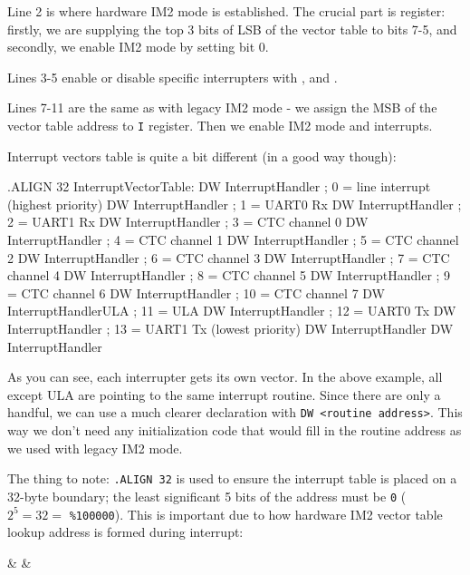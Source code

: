 Line 2 is where hardware IM2 mode is established. The crucial part is  register: firstly, we are supplying the top 3 bits of LSB of the vector table to bits 7-5, and secondly, we enable IM2 mode by setting bit 0.

Lines 3-5 enable or disable specific interrupters with ,  and .

Lines 7-11 are the same as with legacy IM2 mode - we assign the MSB of the vector table address to {\tt I} register. Then we enable IM2 mode and interrupts.

Interrupt vectors table is quite a bit different (in a good way though):

\begin{tcblisting}{}
	.ALIGN 32
InterruptVectorTable:
	DW InterruptHandler        ; 0 = line interrupt (highest priority)
	DW InterruptHandler        ; 1 = UART0 Rx
	DW InterruptHandler        ; 2 = UART1 Rx
	DW InterruptHandler        ; 3 = CTC channel 0
	DW InterruptHandler        ; 4 = CTC channel 1
	DW InterruptHandler        ; 5 = CTC channel 2
	DW InterruptHandler        ; 6 = CTC channel 3
	DW InterruptHandler        ; 7 = CTC channel 4
	DW InterruptHandler        ; 8 = CTC channel 5
	DW InterruptHandler        ; 9 = CTC channel 6
	DW InterruptHandler        ; 10 = CTC channel 7
	DW InterruptHandlerULA     ; 11 = ULA
	DW InterruptHandler        ; 12 = UART0 Tx
	DW InterruptHandler        ; 13 = UART1 Tx (lowest priority)
	DW InterruptHandler
	DW InterruptHandler
\end{tcblisting}

As you can see, each interrupter gets its own vector. In the above example, all except ULA are pointing to the same interrupt routine. Since there are only a handful, we can use a much clearer declaration with {\tt DW <routine address>}. This way we don't need any initialization code that would fill in the routine address as we used with legacy IM2 mode.

The thing to note: {\tt .ALIGN 32} is used to ensure the interrupt table is placed on a 32-byte boundary; the least significant 5 bits of the address must be {\tt 0} ($2^5=32=$ {\tt \%100000}). This is important due to how hardware IM2 vector table lookup address is formed during interrupt:

\begin{BitTableWord}
	 &  &  \\
\end{BitTableWord}

